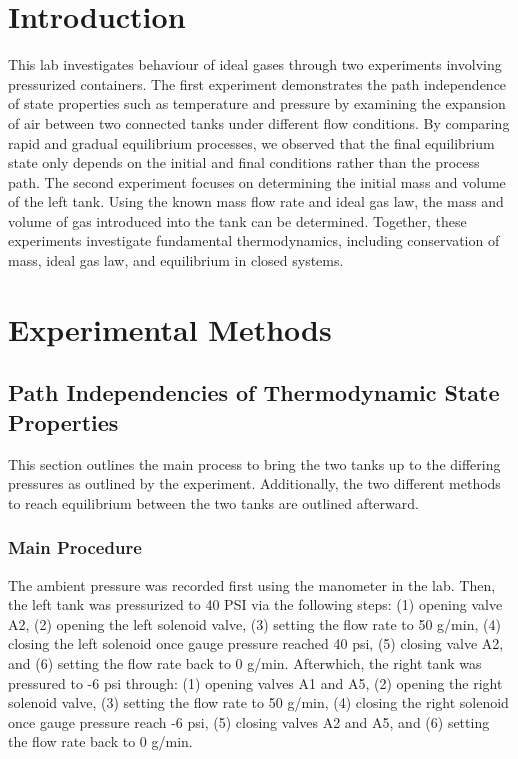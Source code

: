 \documentclass{article} %
\begin{document}
\begin{multicols}{2}

\section{Introduction}
\label{introduction}

This lab investigates behaviour of ideal gases through two experiments involving pressurized containers.
The first experiment demonstrates the path independence of state properties such as temperature and pressure by examining the expansion of air between two connected tanks under different flow conditions.
By comparing rapid and gradual equilibrium processes, we observed that the final equilibrium state only depends on the initial and final conditions rather than the process path. 
The second experiment focuses on determining the initial mass and volume of the left tank. 
Using the known mass flow rate and ideal gas law, the mass and volume of gas introduced into the tank can be determined. 
Together, these experiments investigate fundamental thermodynamics, including conservation of mass, ideal gas law, and equilibrium in closed systems.

\section{Experimental Methods}
\label{experimental_methods}

\subsection{Path Independencies of Thermodynamic State Properties}
\label{methods_path_independencies_thermodynamic_properties}

This section outlines the main process to bring the two tanks up to the differing pressures as outlined by the experiment.
Additionally, the two different methods to reach equilibrium between the two tanks are outlined afterward.

\subsubsection{Main Procedure}

The ambient pressure was recorded first using the manometer in the lab.
Then, the left tank was pressurized to 40 PSI via the following steps:
(1) opening valve A2, (2) opening the left solenoid valve, (3) setting the flow rate to 50 g/min, (4) closing the left solenoid once gauge pressure reached 40 psi, (5) closing valve A2, and (6) setting the flow rate back to 0 g/min.
Afterwhich, the right tank was pressured to -6 psi through:
(1) opening valves A1 and A5, (2) opening the right solenoid valve, (3) setting the flow rate to 50 g/min, (4) closing the right solenoid once gauge pressure reach -6 psi, (5) closing valves A2 and A5, and (6) setting the flow rate back to 0 g/min.


\end{multicols}
\end{document}
